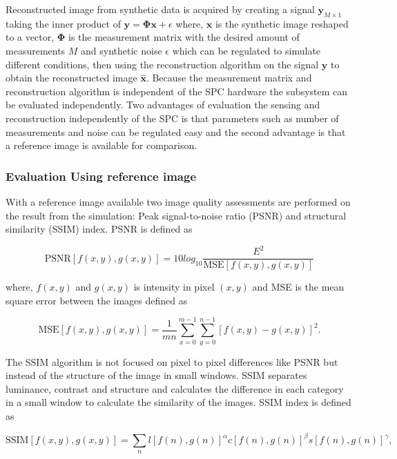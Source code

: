 Reconstructed image from synthetic data is acquired by creating a signal $ \mathbf{ y }_{M\times1}$ taking the inner product of $ \mathbf{y} = \mathbf{\Phi} \mathbf{x} + \epsilon$ where, $\mathbf{x}$ is the synthetic image reshaped to a vector, $\mathbf{\Phi}$ is the measurement matrix with the desired amount of measurements $M$ and synthetic noise $\epsilon$ which can be regulated to simulate different conditions, then using the reconstruction algorithm on the signal $\mathbf{y}$ to obtain the reconstructed image $\mathbf{\hat x}$. Because the measurement matrix and reconstruction algorithm is independent of the SPC hardware the subsystem can be evaluated independently. Two advantages of evaluation the sensing and reconstruction independently of the SPC is that parameters such as number of measurements and noise can be regulated easy and the second advantage is that a reference image is available for comparison.\\[0.1in] 

\subsubsection{Evaluation Using reference image}
With a reference image available two image quality assessments are performed on the result from the simulation: Peak signal-to-noise ratio (PSNR) and structural similarity (SSIM) index. PSNR is defined as

\begin{equation}
    \text{PSNR}[f(x,y),g(x,y)] = 10 log_{10}\frac{E^2}{\text{MSE}[f(x,y),g(x,y)]}
\end{equation}
 
where, $f(x,y)$ and $g(x,y)$ is intensity in pixel $(x,y)$ and MSE is the mean square error between the images defined as

\begin{equation}
\text{MSE}[f(x,y),g(x,y)] = \frac{1}{mn}\sum_{x=0}^{m-1}\sum_{y=0}^{n-1}[f(x,y) - g(x,y)]^2.
\end{equation}

The SSIM algorithm is not focused on pixel to pixel differences like PSNR but instead of the structure of the image in small windows. SSIM separates  luminance, contrast and structure and calculates the difference in each category in a small window to calculate the similarity of the images. SSIM index is defined as

\begin{equation}
\text{SSIM}[f(x,y),g(x,y)] = \sum_nl[f(n),g(n)]^\alpha c[f(n),g(n)]^\beta s[f(n),g(n)]^\gamma ,
\end{equation}

